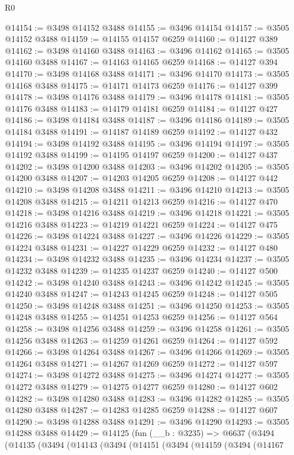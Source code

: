 \begin{lexlean}{R0}
\begin{coremodule}
@14154 := @3498 @14152 @3488
@14155 := @3496 @14154
@14157 := @3505 @14152 @3488
@14159 := @14155 @14157 @6259
@14160 := @14127 @389
@14162 := @3498 @14160 @3488
@14163 := @3496 @14162
@14165 := @3505 @14160 @3488
@14167 := @14163 @14165 @6259
@14168 := @14127 @394
@14170 := @3498 @14168 @3488
@14171 := @3496 @14170
@14173 := @3505 @14168 @3488
@14175 := @14171 @14173 @6259
@14176 := @14127 @399
@14178 := @3498 @14176 @3488
@14179 := @3496 @14178
@14181 := @3505 @14176 @3488
@14183 := @14179 @14181 @6259
@14184 := @14127 @427
@14186 := @3498 @14184 @3488
@14187 := @3496 @14186
@14189 := @3505 @14184 @3488
@14191 := @14187 @14189 @6259
@14192 := @14127 @432
@14194 := @3498 @14192 @3488
@14195 := @3496 @14194
@14197 := @3505 @14192 @3488
@14199 := @14195 @14197 @6259
@14200 := @14127 @437
@14202 := @3498 @14200 @3488
@14203 := @3496 @14202
@14205 := @3505 @14200 @3488
@14207 := @14203 @14205 @6259
@14208 := @14127 @442
@14210 := @3498 @14208 @3488
@14211 := @3496 @14210
@14213 := @3505 @14208 @3488
@14215 := @14211 @14213 @6259
@14216 := @14127 @470
@14218 := @3498 @14216 @3488
@14219 := @3496 @14218
@14221 := @3505 @14216 @3488
@14223 := @14219 @14221 @6259
@14224 := @14127 @475
@14226 := @3498 @14224 @3488
@14227 := @3496 @14226
@14229 := @3505 @14224 @3488
@14231 := @14227 @14229 @6259
@14232 := @14127 @480
@14234 := @3498 @14232 @3488
@14235 := @3496 @14234
@14237 := @3505 @14232 @3488
@14239 := @14235 @14237 @6259
@14240 := @14127 @500
@14242 := @3498 @14240 @3488
@14243 := @3496 @14242
@14245 := @3505 @14240 @3488
@14247 := @14243 @14245 @6259
@14248 := @14127 @505
@14250 := @3498 @14248 @3488
@14251 := @3496 @14250
@14253 := @3505 @14248 @3488
@14255 := @14251 @14253 @6259
@14256 := @14127 @564
@14258 := @3498 @14256 @3488
@14259 := @3496 @14258
@14261 := @3505 @14256 @3488
@14263 := @14259 @14261 @6259
@14264 := @14127 @592
@14266 := @3498 @14264 @3488
@14267 := @3496 @14266
@14269 := @3505 @14264 @3488
@14271 := @14267 @14269 @6259
@14272 := @14127 @597
@14274 := @3498 @14272 @3488
@14275 := @3496 @14274
@14277 := @3505 @14272 @3488
@14279 := @14275 @14277 @6259
@14280 := @14127 @602
@14282 := @3498 @14280 @3488
@14283 := @3496 @14282
@14285 := @3505 @14280 @3488
@14287 := @14283 @14285 @6259
@14288 := @14127 @607
@14290 := @3498 @14288 @3488
@14291 := @3496 @14290
@14293 := @3505 @14288 @3488
@14429 := @14125
    (fun (__b : @3235) =>
    @6637
      (@3494
        (@14135
          (@3494
            (@14143
              (@3494
                (@14151
                  (@3494
                    (@14159
                      (@3494
                        (@14167

\end{coremodule}
\end{lexlean}
